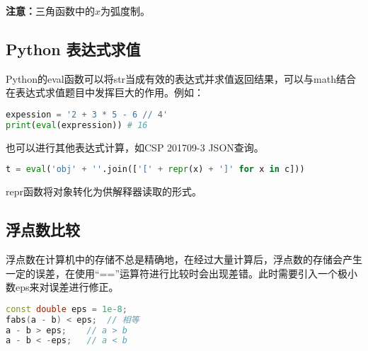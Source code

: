 \textbf{注意：}三角函数中的$x$为弧度制。

\subsection{Python 表达式求值}

Python的eval函数可以将str当成有效的表达式并求值返回结果，可以与math结合在表达式求值题目中发挥巨大的作用。例如：

\begin{lstlisting}[language=python]
expession = '2 + 3 * 5 - 6 // 4'
print(eval(expression))	# 16
\end{lstlisting}

也可以进行其他表达式计算，如CSP 201709-3 JSON查询。

\begin{lstlisting}[language=python]
t = eval('obj' + ''.join(['[' + repr(x) + ']' for x in c]))
\end{lstlisting}

repr函数将对象转化为供解释器读取的形式。

\subsection{浮点数比较}

浮点数在计算机中的存储不总是精确地，在经过大量计算后，浮点数的存储会产生一定的误差，在使用“==”运算符进行比较时会出现差错。此时需要引入一个极小数eps来对误差进行修正。

\begin{lstlisting}[language=c++]
const double eps = 1e-8;
fabs(a - b) < eps;	// 相等
a - b > eps;	// a > b
a - b < -eps;	// a < b
\end{lstlisting}
